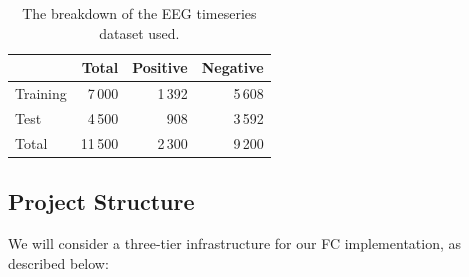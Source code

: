\documentclass[letterpaper]{article}
\begin{document}
 \begin{table}\label{tab.dataset}
    \centering
    \caption{The breakdown of the EEG timeseries dataset used.}
    {\begin{tabular}{@{} lrrr @{}}
      \toprule
       & Total & Positive & Negative\\
      \midrule
      Training & 7\,000 & 1\,392 & 5\,608\\
      Test & 4\,500& 908 & 3\,592\\
      \addlinespace
      Total & 11\,500 & 2\,300 & 9\,200\\
      \bottomrule
    \end{tabular}}
  \end{table}

 \subsection{Project Structure}
 We will consider a three-tier infrastructure for our FC implementation, as described below:
\end{document}
